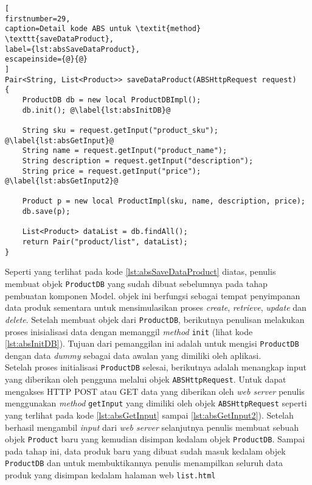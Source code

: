 \begin{lstlisting}[
firstnumber=29,
caption=Detail kode ABS untuk \textit{method} \texttt{saveDataProduct},
label={lst:absSaveDataProduct},
escapeinside={@}{@}
]
Pair<String, List<Product>> saveDataProduct(ABSHttpRequest request)
{
	ProductDB db = new local ProductDBImpl();
	db.init(); @\label{lst:absInitDB}@
	
	String sku = request.getInput("product_sku"); @\label{lst:absGetInput}@
	String name = request.getInput("product_name");
	String description = request.getInput("description");
	String price = request.getInput("price"); @\label{lst:absGetInput2}@
	
	Product p = new local ProductImpl(sku, name, description, price);
	db.save(p);
	
	List<Product> dataList = db.findAll();
	return Pair("product/list", dataList);
}
\end{lstlisting}

Seperti yang terlihat pada kode \ref{lst:absSaveDataProduct} diatas, penulis membuat objek \texttt{ProductDB} yang sudah dibuat sebelumnya pada tahap pembuatan komponen Model. objek ini berfungsi sebagai tempat penyimpanan data produk sementara untuk mensimulasikan proses \textit{create}, \textit{retrieve}, \textit{update} dan \textit{delete}. Setelah membuat objek dari \texttt{ProductDB}, berikutnya penulisan melakukan proses inisialisasi data dengan memanggil \textit{method} \texttt{init} (lihat kode \ref{lst:absInitDB}). Tujuan dari pemanggilan ini adalah untuk mengisi \texttt{ProductDB} dengan data \textit{dummy} sebagai data awalan yang dimiliki oleh aplikasi.\\

Setelah proses initialisasi \texttt{ProductDB} selesai, berikutnya adalah menangkap input yang diberikan oleh pengguna melalui objek \texttt{ABSHttpRequest}. Untuk dapat mengakses HTTP POST atau GET data yang diberikan oleh \textit{web server} penulis menggunakan \textit{method} \texttt{getInput} yang dimiliki oleh objek \texttt{ABSHttpRequest} seperti yang terlihat pada kode \ref{lst:absGetInput} sampai \ref{lst:absGetInput2}). Setelah berhasil mengambil \textit{input} dari \textit{web server} selanjutnya penulis membuat sebuah objek \texttt{Product} baru yang kemudian disimpan kedalam objek \texttt{ProductDB}. Sampai pada tahap ini, data produk baru yang dibuat sudah masuk kedalam objek \texttt{ProductDB} dan untuk membuktikannya penulis menampilkan seluruh data produk yang disimpan kedalam halaman web \texttt{list.html}

